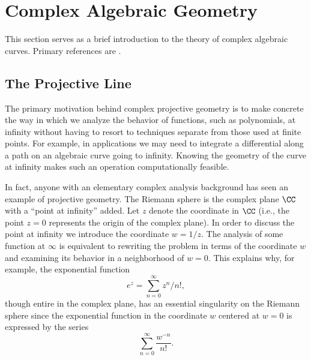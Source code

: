 \section{Complex Algebraic Geometry}

This section serves as a brief introduction to the theory of complex
algebraic curves. Primary references are \cite{Griffiths89,Ueno97}.

\subsection{The Projective Line}

The primary motivation behind complex projective geometry is to make concrete
the way in which we analyze the behavior of functions, such as
polynomials, at infinity without having to resort to techniques separate
from those used at finite points. For example, in applications we may
need to integrate a differential along a path on an algebraic curve
going to infinity. Knowing the geometry of the curve at infinity makes
such an operation computationally feasible.

In fact, anyone with an elementary complex analysis background has seen
an example of projective geometry. The Riemann sphere is the complex
plane $\CC$ with a ``point at infinity'' added. Let $z$ denote the
coordinate in $\CC$ (i.e., the point $z=0$ represents the origin of the
complex plane). In order to discuss the point at infinity we introduce
the coordinate $w = 1/z$. The analysis of some function at $\infty$ is
equivalent to rewriting the problem in terms of the coordinate $w$ and
examining its behavior in a neighborhood of $w=0$. This explains why,
for example, the exponential function
\[
    e^z = \sum_{n=0}^\infty z^n / n!,
\]
though entire in the complex plane, has an essential singularity on the
Riemann sphere since the exponential function in the coordinate $w$
centered at $w=0$ is expressed by the series
\[
    \sum_{n=0}^\infty \frac{w^{-n}}{n!}.
\]

